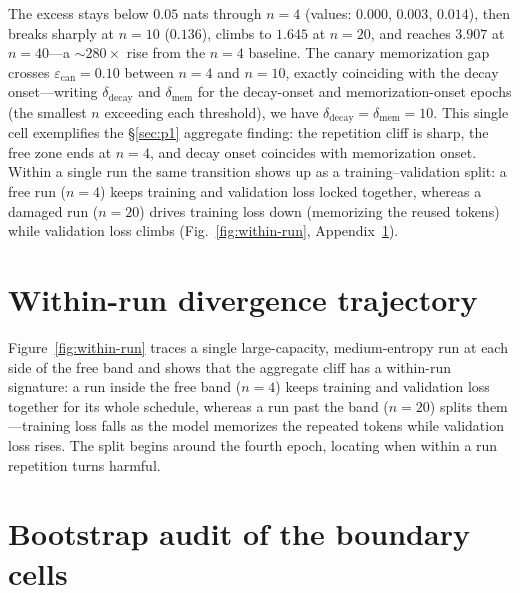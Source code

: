\documentclass[11pt]{article}
\begin{document}
The excess stays below $0.05$ nats through $n = 4$ (values: $0.000$, $0.003$, $0.014$),
then breaks sharply at $n = 10$ ($0.136$), climbs to $1.645$ at $n = 20$, and reaches
$3.907$ at $n = 40$---a $\sim 280\times$ rise from the $n = 4$ baseline.  The canary
memorization gap crosses $\varepsilon_{\mathrm{can}} = 0.10$ between $n = 4$ and
$n = 10$, exactly coinciding with the decay onset---writing $\delta_{\mathrm{decay}}$ and
$\delta_{\mathrm{mem}}$ for the decay-onset and memorization-onset epochs (the smallest $n$
exceeding each threshold), we have $\delta_{\mathrm{decay}} = \delta_{\mathrm{mem}} = 10$.
This single cell exemplifies the \S\ref{sec:p1} aggregate
finding: the repetition cliff is sharp, the free zone ends at $n = 4$, and decay onset
coincides with memorization onset. Within a single run the same transition shows up as a
training--validation split: a free run ($n=4$) keeps training and validation loss locked
together, whereas a damaged run ($n=20$) drives training loss down (memorizing the reused
tokens) while validation loss climbs (Fig.~\ref{fig:within-run}, Appendix~\ref{app:within-run}).



\section{Within-run divergence trajectory}\label{app:within-run}

Figure~\ref{fig:within-run} traces a single large-capacity, medium-entropy run at each side
of the free band and shows that the aggregate cliff has a within-run signature: a run inside
the free band ($n=4$) keeps training and validation loss together for its whole schedule,
whereas a run past the band ($n=20$) splits them---training loss falls as the model memorizes
the repeated tokens while validation loss rises. The split begins around the fourth epoch,
locating when within a run repetition turns harmful.



\section{Bootstrap audit of the boundary cells}\label{app:bootstrap}
\end{document}
